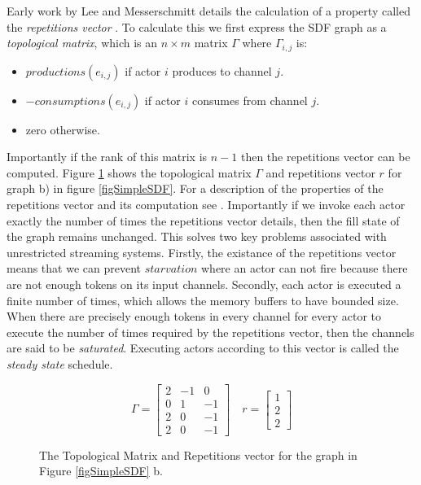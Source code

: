 Early work by Lee and Messerschmitt details the calculation of a property called the {\em repetitions vector} \cite{lee87}.
To calculate this we first express the SDF graph as a {\em topological matrix}, which is an $n \times m$ matrix $\Gamma$ where $\Gamma_{i,j}$ is:
\begin{itemize}
	\item $productions(e_{i,j})$ if actor $i$ produces to channel $j$.
	\item $-consumptions(e_{i,j})$ if actor $i$ consumes from channel $j$.
	\item zero otherwise.
\end{itemize}
\noindent Importantly if the rank of this matrix is $n-1$ then the repetitions vector can be computed.
Figure \ref{figSimpleTop} shows the topological matrix $\Gamma$ and repetitions vector $r$ for graph b) in figure \ref{figSimpleSDF}.
For a description of the properties of the repetitions vector and its computation see \cite{sdfBook}.
Importantly if we invoke each actor exactly the number of times the repetitions vector details, then the fill state of the graph remains unchanged.
This solves two key problems associated with unrestricted streaming systems.
Firstly, the existance of the repetitions vector means that we can prevent $starvation$ where an actor can not fire because there are not enough tokens on its input channels.
Secondly, each actor is executed a finite number of times, which allows the memory buffers to have bounded size.
When there are precisely enough tokens in every channel for every actor to execute the number of times required by the repetitions vector, then the channels are said to be {\em saturated}.
Executing actors according to this vector is called the {\em steady state} schedule.

\begin{figure}
\begin{center}
\[
	\Gamma = \begin{bmatrix}
	2 & -1 & 0 \\
	0 & 1 & -1 \\
	2 & 0 & -1 \\
	2 & 0 & -1
	\end{bmatrix}
	\quad
	r = \begin{bmatrix}
		1 \\
		2 \\
		2
	\end{bmatrix}
\]
\caption{The Topological Matrix and Repetitions vector for the graph in Figure \ref{figSimpleSDF} b.}
\label{figSimpleTop}
\end{center}
\end{figure}

